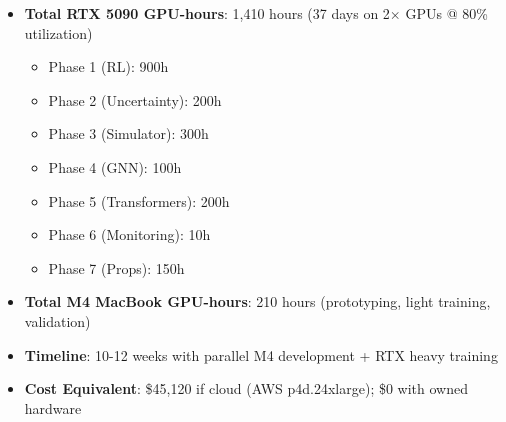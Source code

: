 \begin{itemize}
  \item \textbf{Total RTX 5090 GPU-hours}: 1,410 hours (37 days on 2$\times$ GPUs @ 80\% utilization)
  \begin{itemize}
    \item Phase 1 (RL): 900h
    \item Phase 2 (Uncertainty): 200h
    \item Phase 3 (Simulator): 300h
    \item Phase 4 (GNN): 100h
    \item Phase 5 (Transformers): 200h
    \item Phase 6 (Monitoring): 10h
    \item Phase 7 (Props): 150h
  \end{itemize}
  \item \textbf{Total M4 MacBook GPU-hours}: 210 hours (prototyping, light training, validation)
  \item \textbf{Timeline}: 10-12 weeks with parallel M4 development + RTX heavy training
  \item \textbf{Cost Equivalent}: \$45,120 if cloud (AWS p4d.24xlarge); \$0 with owned hardware
\end{itemize}

\endgroup
